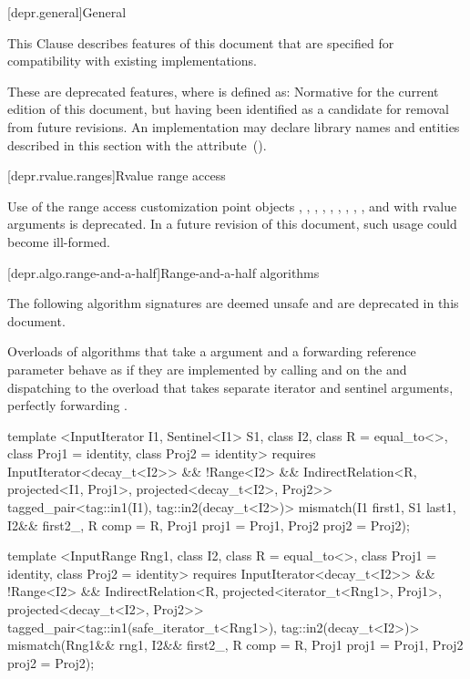 
[depr.general]{General}

\pnum
This Clause describes features of this document that are specified for compatibility with
existing implementations.

\pnum
These are deprecated features, where
is defined as:
Normative for the current edition of this document,
but having been identified as a candidate for removal from future revisions.
An implementation may declare library names and entities described in this section with the
 attribute~().

[depr.rvalue.ranges]{Rvalue range access}

\pnum
Use of the range access customization point objects
, ,
, ,
, ,
, ,
, and 
with rvalue arguments is deprecated. In a future revision of this document,
such usage could become ill-formed.

[depr.algo.range-and-a-half]{Range-and-a-half algorithms}

\pnum
The following algorithm signatures are deemed unsafe and are deprecated in this document.

\pnum
Overloads of algorithms that take a  argument and a forwarding
reference parameter  behave as if they are implemented by calling
 and  on the  and dispatching to the
overload that takes separate iterator and sentinel arguments, perfectly forwarding
.

\begin{codeblock}
template <InputIterator I1, Sentinel<I1> S1, class I2, class R = equal_to<>,
    class Proj1 = identity, class Proj2 = identity>
  requires InputIterator<decay_t<I2>> && !Range<I2> &&
    IndirectRelation<R, projected<I1, Proj1>, projected<decay_t<I2>, Proj2>>
  tagged_pair<tag::in1(I1), tag::in2(decay_t<I2>)>
    mismatch(I1 first1, S1 last1, I2&& first2_, R comp = R{},
             Proj1 proj1 = Proj1{}, Proj2 proj2 = Proj2{});

template <InputRange Rng1, class I2, class R = equal_to<>,
    class Proj1 = identity, class Proj2 = identity>
  requires InputIterator<decay_t<I2>> && !Range<I2> &&
    IndirectRelation<R, projected<iterator_t<Rng1>, Proj1>, projected<decay_t<I2>, Proj2>>
  tagged_pair<tag::in1(safe_iterator_t<Rng1>), tag::in2(decay_t<I2>)>
    mismatch(Rng1&& rng1, I2&& first2_, R comp = R{},
             Proj1 proj1 = Proj1{}, Proj2 proj2 = Proj2{});
\end{codeblock}

